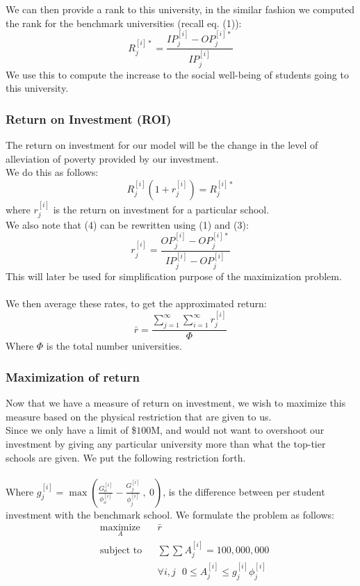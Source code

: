 \documentclass[12pt]{scrartcl}
\begin{document}
		We can then provide a rank to this university, in the similar fashion we computed the rank for the benchmark universities (recall eq. (1)):
		$$
			R_j^{[i]*}=\frac{IP_j^{[i]}-OP_j^{[i]*}}{IP_j^{[i]}}
		$$
		We use this to compute the increase to the social well-being of students going to this university. 

	\subsubsection{Return on Investment (ROI)}
		The return on investment for our model will be the change in the level of alleviation of poverty provided by our investment.\\
		We do this as follows:
		\begin{equation}
			R_j^{[i]}(1+r_j^{[i]}) = R_j^{[i]*}
		\end{equation}
		where $r_j^{[i]}$ is the return on investment for a particular school.\\
		We also note that (4) can be rewritten using (1) and (3):
		\begin{equation}
			r_j^{[i]} = \frac{ OP_j^{[i]} - OP_j^{[i]*}  }{ IP_j^{[i]} - OP_j^{[i]}  }
		\end{equation}	
	 	This will later be used for simplification purpose of the maximization problem.\\
		\\
		We then average these rates, to get the approximated return:
		\begin{equation}
			\bar{r} = \frac{ \sum_{j=1}^\infty\sum_{i=1}^\infty r_j^{[i]}  }{ \Phi }
		\end{equation}
		Where $\Phi$ is the total number universities.
		

	\subsubsection{Maximization of return}
		Now that we have a measure of return on investment, we wish to maximize this measure based on the physical restriction that are given to us.\\
		Since we only have a limit of \$$100$M, and would not want to overshoot our investment by giving any particular university more than what the top-tier schools are given. We put the following restriction forth.\\
		\\
		Where $g_j^{[i]} = \max( \frac{  G_o^{[i]}  }{  \phi_o^{[i]} } - \frac{  G_j^{[i]}  }{  \phi_j^{[i]} } \ ,\ 0 )$, is the difference between per student investment with the benchmark school. We formulate the problem as follows:
		\begin{equation}
				\begin{aligned}
					& \underset{A}{\text{maximize}}
					& &\bar{r}\\
					& \text{subject to}
					& & \sum \sum A_j^{[i]} = 100,000,000 \\
					&&& \forall i,j \ \ \ 0\le A_j^{[i]} \le g_j^{[i]}\phi_j^{[i]}
				\end{aligned}
		\end{equation}
\end{document}
